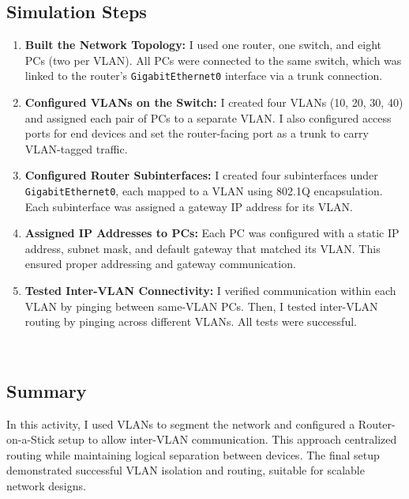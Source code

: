 \documentclass[11pt,a4paper]{article}
\let\oldincludegraphics\includegraphics
\renewcommand{\includegraphics}[2][]{%
  \begin{center}
    \oldincludegraphics[#1]{#2}
  \end{center}
}
\begin{document}
\subsection{Simulation Steps}
\begin{enumerate}

\item \textbf{Built the Network Topology:} I used one router, one switch, and eight PCs (two per VLAN). All PCs were connected to the same switch, which was linked to the router’s \texttt{GigabitEthernet0} interface via a trunk connection.


\item \textbf{Configured VLANs on the Switch:} I created four VLANs (10, 20, 30, 40) and assigned each pair of PCs to a separate VLAN. I also configured access ports for end devices and set the router-facing port as a trunk to carry VLAN-tagged traffic.


\item \textbf{Configured Router Subinterfaces:} I created four subinterfaces under \texttt{GigabitEthernet0}, each mapped to a VLAN using 802.1Q encapsulation. Each subinterface was assigned a gateway IP address for its VLAN.


\item \textbf{Assigned IP Addresses to PCs:} Each PC was configured with a static IP address, subnet mask, and default gateway that matched its VLAN. This ensured proper addressing and gateway communication.


\item \textbf{Tested Inter-VLAN Connectivity:} I verified communication within each VLAN by pinging between same-VLAN PCs. Then, I tested inter-VLAN routing by pinging across different VLANs. All tests were successful.

 \\[1em]

\end{enumerate}

\subsection{Summary} 
In this activity, I used VLANs to segment the network and configured a Router-on-a-Stick setup to allow inter-VLAN communication. This approach centralized routing while maintaining logical separation between devices. The final setup demonstrated successful VLAN isolation and routing, suitable for scalable network designs.
\end{document}
